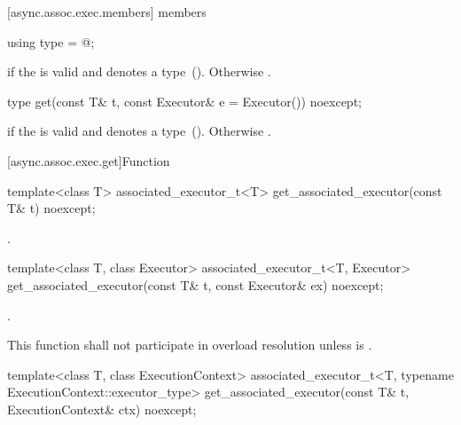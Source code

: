 [async.assoc.exec.members]{ members}

\begin{itemdecl}
using type = @\seebelow@;
\end{itemdecl}

\begin{itemdescr}
\pnum
\ctype {} if the  
is valid and denotes a type~().
Otherwise .
\end{itemdescr}

\begin{itemdecl}
type get(const T& t, const Executor& e = Executor()) noexcept;
\end{itemdecl}

\begin{itemdescr}
\pnum
\returns {} if the  
is valid and denotes a type~().
Otherwise .
\end{itemdescr}




[async.assoc.exec.get]{Function }

%
\begin{itemdecl}
template<class T>
  associated_executor_t<T> get_associated_executor(const T& t) noexcept;
\end{itemdecl}

\begin{itemdescr}
\pnum
\returns {}.
\end{itemdescr}

\begin{itemdecl}
template<class T, class Executor>
  associated_executor_t<T, Executor>
    get_associated_executor(const T& t, const Executor& ex) noexcept;
\end{itemdecl}

\begin{itemdescr}
\pnum
\returns {}.

\pnum
\remarks This function shall not participate in overload resolution unless
 is .
\end{itemdescr}

\begin{itemdecl}
template<class T, class ExecutionContext>
  associated_executor_t<T, typename ExecutionContext::executor_type>
    get_associated_executor(const T& t, ExecutionContext& ctx) noexcept;
\end{itemdecl}

